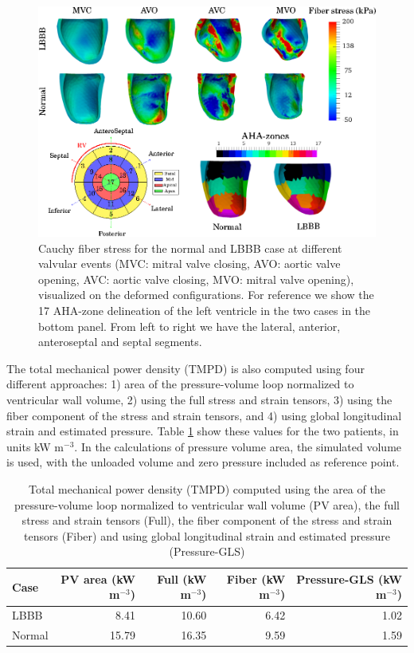 \begin{figure}[htbp]
  \centering
  \includegraphics{figures/snap_shots}
  \caption{\label{fig:snap_shots}Cauchy fiber stress for the normal and LBBB case at
    different valvular events (MVC: mitral valve closing, AVO: aortic
    valve opening, AVC: aortic valve closing, MVO: mitral valve
    opening), visualized on the deformed configurations. For reference
    we show the 17 AHA-zone delineation of the left ventricle in the
    two cases in the bottom panel. From left to right we have the
    lateral, anterior, anteroseptal and septal segments. }
\end{figure}




The total mechanical power density (TMPD) is also computed using four
different approaches: 1) area of the pressure-volume loop normalized
to ventricular wall volume, 2) using the full stress and strain tensors,
3) using the fiber component of the stress and strain tensors, and 4)
using global longitudinal strain and estimated pressure. Table
\ref{tab:total_mechanical_power} show these values for the two
patients, in units kW m$^{-3}$. In the calculations of pressure volume
area, the simulated volume is used, with the unloaded volume and zero
pressure included as reference point.

\begin{table}
\caption{Total mechanical power density (TMPD) computed using the area
  of the pressure-volume loop normalized to ventricular wall volume
  (PV area), the full stress and strain tensors (Full), the fiber
  component of the stress and strain tensors (Fiber) and using global
  longitudinal strain and estimated pressure (Pressure-GLS)} 
\begin{tabular}{lrrrr}
\hline
 Case   &   PV area (kW m$^{-3}$) &   Full (kW m$^{-3}$) &   Fiber (kW m$^{-3}$) &   Pressure-GLS (kW m$^{-3}$) \\
\hline
 LBBB   &                    8.41 &                10.60 &                  6.42 &                         1.02 \\
 Normal &                   15.79 &                16.35 &                  9.59 &                         1.59 \\
\hline
\end{tabular}
\label{tab:total_mechanical_power}
\end{table}


